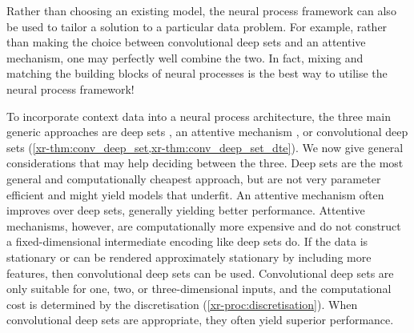 \documentclass[12pt, twoside]{report}
\newcommand{\xrprefix}[1]{xr-#1}
\begin{document}
Rather than choosing an existing model, the neural process framework can also be used to tailor a solution to a particular data problem.
For example, rather than making the choice between convolutional deep sets and an attentive mechanism,
one may perfectly well combine the two.
In fact,
mixing and matching the building blocks of neural processes
is the best way to utilise the neural process framework!

To incorporate context data into a neural process architecture,
the three main generic approaches are
deep sets \parencite[\cref{\xrprefix{thm:deep_set}};][]{Zaheer:2017:Deep_Sets,Edwards:2017:Towards_a_Neural_Statistician,Garnelo:2018:Neural_Processes,Wagstaff:2019:On_the_Limitations_of_Representing},
an attentive mechanism \parencite{Bahdanau:2015:Neural_Machine_Translation_by_Jointly,Vaswani:2017:Attention_Is_All_You_Need,Kim:2019:Attentive_Neural_Processes},
or convolutional deep sets (\cref{\xrprefix{thm:conv_deep_set},\xrprefix{thm:conv_deep_set_dte}}).
We now give general considerations that may help deciding between the three.
Deep sets are the most general and computationally cheapest approach, but are not very parameter efficient and might yield models that underfit.
An attentive mechanism often improves over deep sets, generally yielding better performance.
Attentive mechanisms, however, are computationally more expensive
and do not construct a fixed-dimensional intermediate encoding like deep sets do. %
If the data is stationary or can be rendered approximately stationary by including more features, then
convolutional deep sets can be used.
Convolutional deep sets are only suitable for one, two, or three-dimensional inputs, and the computational cost is determined by the discretisation (\cref{\xrprefix{proc:discretisation}}).
When convolutional deep sets are appropriate, they often yield superior performance.
\end{document}
